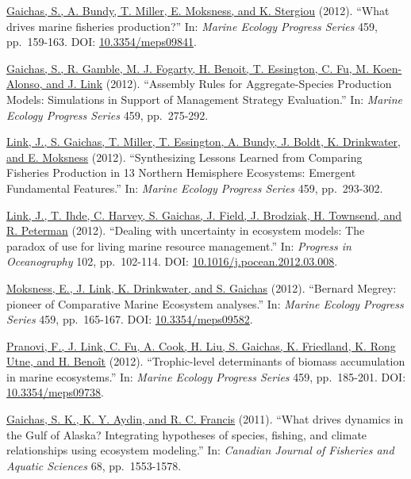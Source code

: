 \documentclass[11pt, a4paper]{awesome-cv}
\begin{document}
\protect\hyperlink{cite-gaichas_what_2012}{Gaichas, S., A. Bundy, T.
Miller, E. Moksness, and K. Stergiou} (2012). ``What drives marine
fisheries production?'' In: \emph{Marine Ecology Progress Series} 459,
pp.~159-163. DOI:
\href{https://doi.org/10.3354\%2Fmeps09841}{10.3354/meps09841}.

\protect\hyperlink{cite-gaichas_assembly_2012}{Gaichas, S., R. Gamble,
M. J. Fogarty, H. Benoit, T. Essington, C. Fu, M. Koen-Alonso, and J.
Link} (2012). ``Assembly Rules for Aggregate-Species Production Models:
Simulations in Support of Management Strategy Evaluation.'' In:
\emph{Marine Ecology Progress Series} 459, pp.~275-292.

\protect\hyperlink{cite-link_synthesizing_2012}{Link, J., S. Gaichas, T.
Miller, T. Essington, A. Bundy, J. Boldt, K. Drinkwater, and E.
Moksness} (2012). ``Synthesizing Lessons Learned from Comparing
Fisheries Production in 13 Northern Hemisphere Ecosystems: Emergent
Fundamental Features.'' In: \emph{Marine Ecology Progress Series} 459,
pp.~293-302.

\protect\hyperlink{cite-link_dealing_2012}{Link, J., T. Ihde, C. Harvey,
S. Gaichas, J. Field, J. Brodziak, H. Townsend, and R. Peterman} (2012).
``Dealing with uncertainty in ecosystem models: The paradox of use for
living marine resource management.'' In: \emph{Progress in Oceanography}
102, pp.~102-114. DOI:
\href{https://doi.org/10.1016\%2Fj.pocean.2012.03.008}{10.1016/j.pocean.2012.03.008}.

\protect\hyperlink{cite-moksness_bernard_2012}{Moksness, E., J. Link, K.
Drinkwater, and S. Gaichas} (2012). ``Bernard Megrey: pioneer of
Comparative Marine Ecosystem analyses.'' In: \emph{Marine Ecology
Progress Series} 459, pp.~165-167. DOI:
\href{https://doi.org/10.3354\%2Fmeps09582}{10.3354/meps09582}.

\protect\hyperlink{cite-pranovi_trophic-level_2012}{Pranovi, F., J.
Link, C. Fu, A. Cook, H. Liu, S. Gaichas, K. Friedland, K. Rong Utne,
and H. Benoît} (2012). ``Trophic-level determinants of biomass
accumulation in marine ecosystems.'' In: \emph{Marine Ecology Progress
Series} 459, pp.~185-201. DOI:
\href{https://doi.org/10.3354\%2Fmeps09738}{10.3354/meps09738}.

\protect\hyperlink{cite-gaichas_what_2011}{Gaichas, S. K., K. Y. Aydin,
and R. C. Francis} (2011). ``What drives dynamics in the Gulf of Alaska?
Integrating hypotheses of species, fishing, and climate relationships
using ecosystem modeling.'' In: \emph{Canadian Journal of Fisheries and
Aquatic Sciences} 68, pp.~1553-1578.
\end{document}
